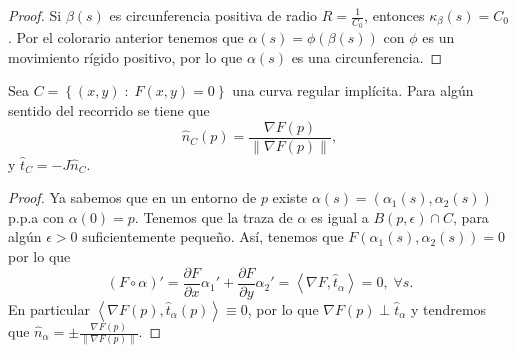 \begin{proof}
Si $\displaystyle \beta\left(s\right) $ es circunferencia positiva de radio $\displaystyle R = \frac{1}{C_{0}} $, entonces $\displaystyle \kappa_{\beta }\left(s\right)=C_{0} $. Por el colorario anterior tenemos que $\displaystyle \alpha\left(s\right)=\phi\left(\beta\left(s\right)\right) $ con $\displaystyle \phi $ es un movimiento rígido positivo, por lo que $\displaystyle \alpha\left(s\right) $ es una circunferencia.
\end{proof}
 
\begin{prop}
Sea $\displaystyle C = \left\{ \left(x,y\right) \; : \; F\left(x,y\right)=0\right\}  $ una curva regular implícita. Para algún sentido del recorrido se tiene que 
\[\hat{n}_{C}\left(p\right)=\frac{\nabla F\left(p\right)}{\|\nabla F\left(p\right)\|} ,\]
y $\displaystyle \hat{t}_{C}=-J\hat{n}_{C} $. 
\end{prop}
\begin{proof}
Ya sabemos que en un entorno de $\displaystyle p $ existe $\displaystyle \alpha\left(s\right)=\left(\alpha_{1}\left(s\right), \alpha_{2}\left(s\right)\right) $ p.p.a con $\displaystyle \alpha\left(0\right)=p $. Tenemos que la traza de $\displaystyle \alpha  $ es igual a $\displaystyle B\left(p, \epsilon \right)\cap C $, para algún $\displaystyle \epsilon > 0 $ suficientemente pequeño. 
Así, tenemos que $\displaystyle F\left(\alpha_{1}\left(s\right), \alpha_{2}\left(s\right)\right)=0 $ por lo que
\[\left(F\circ \alpha \right)' = \frac{\partial F}{\partial x}\alpha_{1}' + \frac{\partial F}{\partial y}\alpha_{2}' = \left\langle \nabla F, \hat{t}_{\alpha } \right\rangle =0, \; \forall s .\]
En particular $\displaystyle \left\langle \nabla F\left(p\right), \hat{t}_{\alpha }\left(p\right) \right\rangle \equiv 0 $, por lo que $\displaystyle \nabla F\left(p\right)\perp \hat{t}_{\alpha } $ y tendremos que $\displaystyle \hat{n}_{\alpha }=\pm \frac{\nabla F\left(p\right)}{\|\nabla F\left(p\right)\|} $. 
\end{proof}
